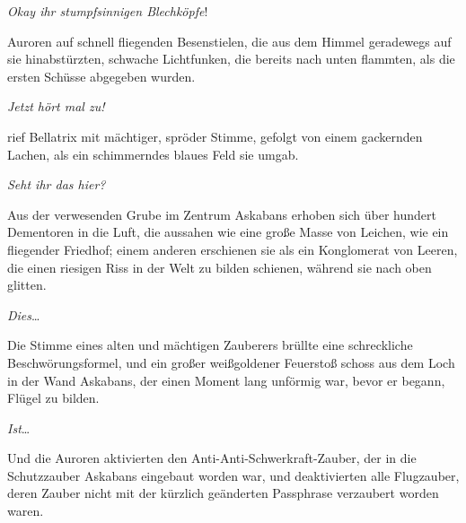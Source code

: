 \emph{Okay ihr stumpfsinnigen Blechköpfe}!

Auroren auf schnell fliegenden Besenstielen, die aus dem Himmel geradewegs auf sie hinabstürzten, schwache Lichtfunken, die bereits nach unten flammten, als die ersten Schüsse abgegeben wurden.

\emph{Jetzt hört mal zu!}

 rief Bellatrix mit mächtiger, spröder Stimme, gefolgt von einem gackernden Lachen, als ein schimmerndes blaues Feld sie umgab.

\emph{Seht ihr das hier?}

Aus der verwesenden Grube im Zentrum Askabans erhoben sich über hundert Dementoren in die Luft, die aussahen wie eine große Masse von Leichen, wie ein fliegender Friedhof; einem anderen erschienen sie als ein Konglomerat von Leeren, die einen riesigen Riss in der Welt zu bilden schienen, während sie nach oben glitten.

\emph{Dies}…

Die Stimme eines alten und mächtigen Zauberers brüllte eine schreckliche Beschwörungsformel, und ein großer weißgoldener Feuerstoß schoss aus dem Loch in der Wand Askabans, der einen Moment lang unförmig war, bevor er begann, Flügel zu bilden.

\emph{Ist}…

Und die Auroren aktivierten den Anti-Anti-Schwerkraft-Zauber, der in die Schutzzauber Askabans eingebaut worden war, und deaktivierten alle Flugzauber, deren Zauber nicht mit der kürzlich geänderten Passphrase verzaubert worden waren.

